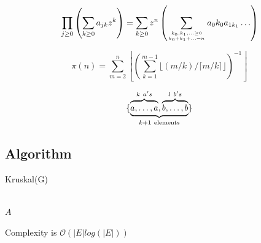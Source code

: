 \documentclass[a4paper,12pt,hidelinks]{article}
\newcommand{\Card}[1]{\left\lvert#1\right\rvert}
\newcommand{\Oh}[1]{\mathcal{O}\left(#1\right)}
\newcommand{\Union}{\cup}
\begin{document}
	\begin{equation}
		\prod_{j\geq 0}
		\left(\sum_{k\geq 0}a_{jk} z^k\right) 
		= \sum_{k\geq 0} z^n
		\left( \sum_{{k_0,k_1,\ldots\geq 0}
		\atop{k_0+k_1+\ldots=n}    }
		a{_0k_0}a_{1k_1}\ldots  \right) 
	\end{equation}

	\begin{equation}
		\pi(n) = \sum_{m=2}^{n}
		\left\lfloor \left(\sum_{k=1}^{m-1}
		\lfloor(m/k)/\lceil m/k\rceil 
		\rfloor \right)^{-1}
		\right\rfloor
	\end{equation}

	\begin{equation}
		\{\underbrace{
			\overbrace{\mathstrut a,\ldots,a}^{k\ a's},
			\overbrace{\mathstrut b,\ldots,b}^{l\ b's}}
			_{k+1\ \mathrm{elements}}                   \}
	\end{equation}

	\subsection{Algorithm}

	\begin{algorithm}[H]
		\caption{Kruskal(G)}
		\begin{algorithmic}[1]
			\EndFor
					\State{$A \Union (u,v)$}
				\EndIf
			\EndFor\\
			\Return $A$
		\end{algorithmic}
	\end{algorithm}
	Complexity is $\Oh{\Card{E}log(\Card{E})}$

\pagebreak 

\printbibliography
\end{document}
